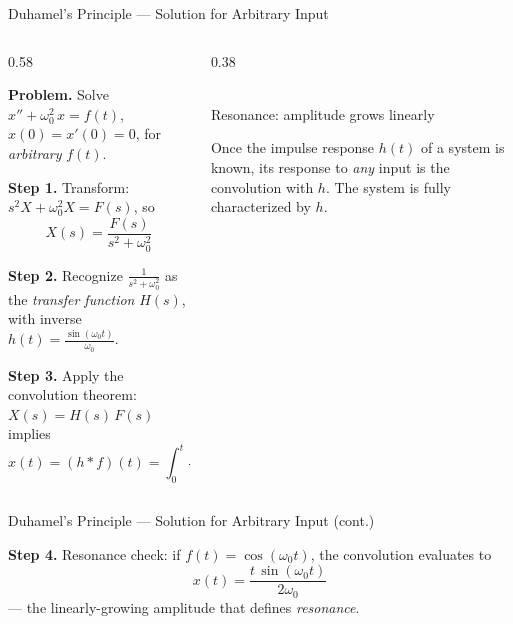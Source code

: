 \documentclass[aspectratio=169,11pt]{beamer}
\begin{document}
\begin{frame}{Duhamel's Principle --- Solution for Arbitrary Input}
\footnotesize
\begin{columns}[T]
\begin{column}{0.58\textwidth}
\begin{examplebox}
\textbf{Problem.} Solve $x'' + \omega_0^2\, x = f(t)$, $x(0) = x'(0) = 0$, for \emph{arbitrary} $f(t)$.

\textbf{Step 1.} Transform: $s^2 X + \omega_0^2 X = F(s)$, so
\[X(s) = \frac{F(s)}{s^2 + \omega_0^2}\]

\textbf{Step 2.} Recognize $\frac{1}{s^2+\omega_0^2}$ as the \emph{transfer function} $H(s)$, with inverse $h(t) = \frac{\sin(\omega_0 t)}{\omega_0}$.

\textbf{Step 3.} Apply the convolution theorem: $X(s) = H(s)\,F(s)$ implies
\[x(t) = (h * f)(t) = \int_0^t \frac{\sin(\omega_0(t-\tau))}{\omega_0}\, f(\tau)\,d\tau\]

\end{examplebox}
\end{column}
\begin{column}{0.38\textwidth}
\centering
{}\\[1mm]
{\footnotesize\color{warnred}Resonance: amplitude grows linearly}
\vspace{1mm}
\begin{conceptbox}
Once the impulse response $h(t)$ of a system is known, its response to \emph{any} input is the convolution with $h$. The system is fully characterized by $h$.
\end{conceptbox}
\end{column}
\end{columns}
\end{frame}

\begin{frame}{Duhamel's Principle --- Solution for Arbitrary Input (cont.)}
\footnotesize
\begin{examplebox}
\textbf{Step 4.} Resonance check: if $f(t) = \cos(\omega_0 t)$, the convolution evaluates to
\[x(t) = \frac{t\,\sin(\omega_0 t)}{2\omega_0}\]
--- the linearly-growing amplitude that defines \emph{resonance}.
\end{examplebox}
\end{frame}
\end{document}
